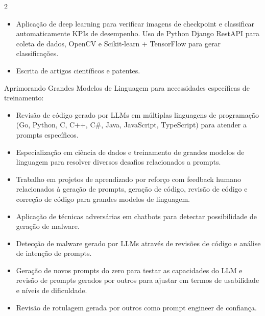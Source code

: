 \documentclass[10pt,a4paper,ragged2e,withhyper]{altacv}
\begin{document}
\begin{paracol}{2}
\begin{itemize}
    \item Aplicação de deep learning para verificar imagens de checkpoint e classificar automaticamente KPIs de desempenho. Uso de Python Django RestAPI para coleta de dados, OpenCV e Scikit-learn + TensorFlow para gerar classificações.
    
    \item Escrita de artigos científicos e patentes.
    
\end{itemize}
\divider


Aprimorando Grandes Modelos de Linguagem para necessidades específicas de treinamento:

\begin{itemize}
        
    \item Revisão de código gerado por LLMs em múltiplas linguagens de programação (Go, Python, C, C++, C\#, Java, JavaScript, TypeScript) para atender a prompts específicos.

    \item Especialização em ciência de dados e treinamento de grandes modelos de linguagem para resolver diversos desafios relacionados a prompts.

    \item Trabalho em projetos de aprendizado por reforço com feedback humano relacionados à geração de prompts, geração de código, revisão de código e correção de código para grandes modelos de linguagem.

    \item Aplicação de técnicas adversárias em chatbots para detectar possibilidade de geração de malware.

    \item Detecção de malware gerado por LLMs através de revisões de código e análise de intenção de prompts.

    \item Geração de novos prompts do zero para testar as capacidades do LLM e revisão de prompts gerados por outros para ajustar em termos de usabilidade e níveis de dificuldade.

    \item Revisão de rotulagem gerada por outros como prompt engineer de confiança.
    
\end{itemize}
\divider


\end{paracol}
\end{document}
